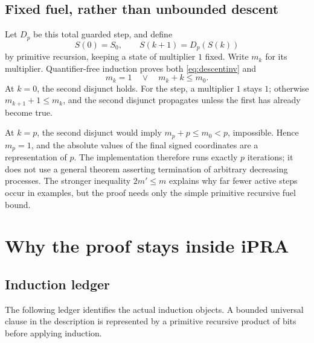 \documentclass[11pt,letterpaper]{article}
\theoremstyle{definition}
\theoremstyle{remark}
\begin{document}
\subsection{Fixed fuel, rather than unbounded descent}

Let \(D_p\) be this total guarded step, and define
\[
 S(0)=S_0,\qquad S(k+1)=D_p(S(k))
\]
by primitive recursion, keeping a state of multiplier \(1\) fixed.
Write \(m_k\) for its multiplier.
Quantifier-free induction proves both \eqref{eq:descentinv} and
\begin{equation}
 m_k=1\quad\vee\quad m_k+k\le m_0.
 \label{eq:clock}
\end{equation}
At \(k=0\), the second disjunct holds. For the step, a multiplier \(1\)
stays \(1\); otherwise \(m_{k+1}+1\le m_k\), and the second disjunct
propagates unless the first has already become true.

At \(k=p\), the second disjunct would imply
\(m_p+p\le m_0<p\), impossible. Hence \(m_p=1\), and the absolute values
of the final signed coordinates are a representation of \(p\).
The implementation therefore runs exactly \(p\) iterations; it does not
use a general theorem asserting termination of arbitrary decreasing
processes. The stronger inequality \(2m'\le m\) explains why far fewer
active steps occur in examples, but the proof needs only the simple
primitive recursive fuel bound.

\section{Why the proof stays inside iPRA}
\label{sec:audit}

\subsection{Induction ledger}

The following ledger identifies the actual induction objects. A bounded
universal clause in the description is represented by a primitive
recursive product of bits before applying induction.
\end{document}
